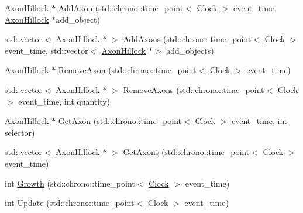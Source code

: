\begin{DoxyCompactItemize}
\item 
\mbox{\hyperlink{class_axon_hillock}{Axon\+Hillock}} $\ast$ \mbox{\hyperlink{class_axon_hillock_a02bfbaea9ea7a160933f8500c8b41d6a}{Add\+Axon}} (std\+::chrono\+::time\+\_\+point$<$ \mbox{\hyperlink{universe_8h_a0ef8d951d1ca5ab3cfaf7ab4c7a6fd80}{Clock}} $>$ event\+\_\+time, \mbox{\hyperlink{class_axon_hillock}{Axon\+Hillock}} $\ast$add\+\_\+object)
\item 
std\+::vector$<$ \mbox{\hyperlink{class_axon_hillock}{Axon\+Hillock}} $\ast$ $>$ \mbox{\hyperlink{class_axon_hillock_a54a82227b96757f1c0d7450df6a3df37}{Add\+Axons}} (std\+::chrono\+::time\+\_\+point$<$ \mbox{\hyperlink{universe_8h_a0ef8d951d1ca5ab3cfaf7ab4c7a6fd80}{Clock}} $>$ event\+\_\+time, std\+::vector$<$ \mbox{\hyperlink{class_axon_hillock}{Axon\+Hillock}} $\ast$$>$ add\+\_\+objects)
\item 
\mbox{\hyperlink{class_axon_hillock}{Axon\+Hillock}} $\ast$ \mbox{\hyperlink{class_axon_hillock_ae7c379ef3a70c8a43a0f105ccc94b54b}{Remove\+Axon}} (std\+::chrono\+::time\+\_\+point$<$ \mbox{\hyperlink{universe_8h_a0ef8d951d1ca5ab3cfaf7ab4c7a6fd80}{Clock}} $>$ event\+\_\+time)
\item 
std\+::vector$<$ \mbox{\hyperlink{class_axon_hillock}{Axon\+Hillock}} $\ast$ $>$ \mbox{\hyperlink{class_axon_hillock_a7f10edff727271408887d29a70e7e671}{Remove\+Axons}} (std\+::chrono\+::time\+\_\+point$<$ \mbox{\hyperlink{universe_8h_a0ef8d951d1ca5ab3cfaf7ab4c7a6fd80}{Clock}} $>$ event\+\_\+time, int quantity)
\item 
\mbox{\hyperlink{class_axon_hillock}{Axon\+Hillock}} $\ast$ \mbox{\hyperlink{class_axon_hillock_a08fde7d1b8a40ba7a052315f95b743f0}{Get\+Axon}} (std\+::chrono\+::time\+\_\+point$<$ \mbox{\hyperlink{universe_8h_a0ef8d951d1ca5ab3cfaf7ab4c7a6fd80}{Clock}} $>$ event\+\_\+time, int selector)
\item 
std\+::vector$<$ \mbox{\hyperlink{class_axon_hillock}{Axon\+Hillock}} $\ast$ $>$ \mbox{\hyperlink{class_axon_hillock_af35663768cbe818e092382519a6d73e3}{Get\+Axons}} (std\+::chrono\+::time\+\_\+point$<$ \mbox{\hyperlink{universe_8h_a0ef8d951d1ca5ab3cfaf7ab4c7a6fd80}{Clock}} $>$ event\+\_\+time)
\item 
int \mbox{\hyperlink{class_axon_hillock_a5c5cd9008f1410898980528b959d668e}{Growth}} (std\+::chrono\+::time\+\_\+point$<$ \mbox{\hyperlink{universe_8h_a0ef8d951d1ca5ab3cfaf7ab4c7a6fd80}{Clock}} $>$ event\+\_\+time)
\item 
int \mbox{\hyperlink{class_axon_hillock_a5a6a6a93a98b32c303b9ee6320c09909}{Update}} (std\+::chrono\+::time\+\_\+point$<$ \mbox{\hyperlink{universe_8h_a0ef8d951d1ca5ab3cfaf7ab4c7a6fd80}{Clock}} $>$ event\+\_\+time)
\end{DoxyCompactItemize}
